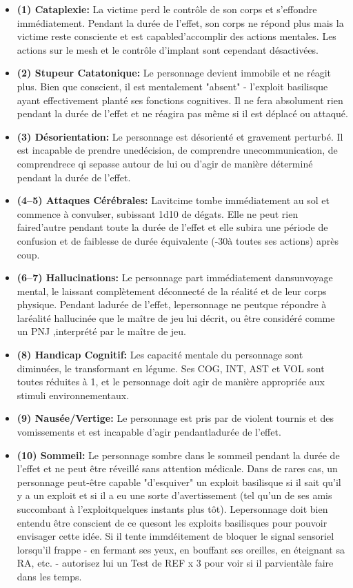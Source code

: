 \begin{itemize} \item \textbf{(1) Cataplexie: }La victime perd le contrôle de son corps et s'effondre immédiatement. Pendant la durée de l'effet, son corps ne répond plus mais la victime reste consciente et est capabled'accomplir des actions mentales. Les actions sur le mesh et le contrôle d'implant sont cependant désactivées. \item \textbf{(2) Stupeur Catatonique:} Le personnage devient immobile et ne réagit plus. Bien que conscient, il est mentalement "absent" - l'exploit basilisque ayant effectivement planté ses fonctions cognitives. Il ne fera absolument rien pendant la durée de l'effet et ne réagira pas même si il est déplacé ou attaqué. \item \textbf{(3) Désorientation:} Le personnage est désorienté et gravement perturbé. Il est incapable de prendre unedécision, de comprendre unecommunication, de comprendrece qi sepasse autour de lui ou d'agir de manière déterminé pendant la durée de l'effet. \item \textbf{(4–5) Attaques Cérébrales:} Lavitcime tombe immédiatement au sol et commence à convulser, subissant 1d10 de dégats. Elle ne peut rien faired'autre pendant toute la durée de l'effet et elle subira une période de confusion et de faiblesse de durée équivalente (-30à toutes ses actions) après coup. \item \textbf{(6–7) Hallucinations:} Le personnage part immédiatement dansunvoyage mental, le laissant complètement déconnecté de la réalité et de leur corps physique. Pendant ladurée de l'effet, lepersonnage ne peutque répondre à laréalité hallucinée que le maître de jeu lui décrit, ou être considéré comme un PNJ ,interprété par le maître de jeu. \item \textbf{(8) Handicap Cognitif:} Les capacité mentale du personnage sont diminuées, le transformant en légume. Ses COG, INT, AST et VOL sont toutes réduites à 1, et le personnage doit agir de manière appropriée aux stimuli environnementaux. \item \textbf{(9) Nausée/Vertige:} Le personnage est pris par de violent tournis et des vomissements et est incapable d'agir pendantladurée de l'effet. \item \textbf{(10) Sommeil:} Le personnage sombre dans le sommeil pendant la durée de l'effet et ne peut être réveillé sans attention médicale. Dans de rares cas, un personnage peut-être capable "d'esquiver" un exploit basilisque si il sait qu'il y a un exploit et si il a eu une sorte d'avertissement (tel qu'un de ses amis succombant à l'exploitquelques instants plus tôt). Lepersonnage doit bien entendu être conscient de ce quesont les exploits basilisques pour pouvoir envisager cette idée. Si il tente immdéitement de bloquer le signal sensoriel lorsqu'il frappe - en fermant ses yeux, en bouffant ses oreilles, en éteignant sa RA, etc. - autorisez lui un Test de REF x 3 pour voir si il parvientàle faire dans les temps. \end{itemize} 

